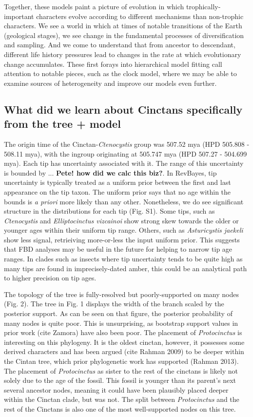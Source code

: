 \documentclass{article}
\begin{document}
Together, these models paint a picture of evolution in which trophically-important characters evolve according to different mechanisms than non-trophic characters.
We see a world in which at times of notable transitions of the Earth (geological stages), we see change in the fundamental processes of diversification and sampling.
And we come to understand that from ancestor to descendant, different life history pressures lead to changes in the rate at which evolutionary change accumulates. 
These first forays into hierarchical model fitting call attention to notable pieces, such as the clock model, where we may be able to examine sources of heterogeneity and improve our models even further.

\subsection{What did we learn about Cinctans specifically from the tree + model}

The origin time of the Cinctan-\textit{Ctenocystis} group was 507.52 mya (HPD 505.808 - 508.11 mya), with the ingroup originating at 505.747 mya (HPD 507.27 - 504.699 mya).
Each tip has uncertainty associated with it.
The range of this uncertainty is bounded by ... \textbf{Pete! how did we calc this biz?}.
In RevBayes, tip uncertainty is typically treated as a uniform prior between the first and last appearance on the tip taxon.
The uniform prior says that no age within the bounds is \textit{a priori} more likely than any other.
Nonetheless, we do see significant structure in the distributions for each tip (Fig. S1). 
Some tips, such as \textit{Ctenocystis} and \textit{Elliptocinctus vizcainoi} show strong skew towards the older or younger ages within their uniform tip range.
Others, such as \textit{Asturicystis jaekeli} show less signal, retrieiving more-or-less the input uniform prior.
This suggests that FBD analyses may be useful in the future for helping to narrow tip age ranges.
In clades such as insects where tip uncertainty tends to be quite high as many tips are found in imprecisely-dated amber, this could be an analytical path to higher precision on tip ages.

The topology of the tree is fully-resolved but poorly-supported on many nodes (Fig. 2).
The tree in Fig. 1 displays the width of the branch scaled by the posterior support.
As can be seen on that figure, the posterior probability of many nodes is quite poor. 
This is unsurprising, as bootstrap support values in prior work (cite Zamora) have also been poor.
The placement of \textit{Protocinctus} is interesting on this phylogeny. 
It is the oldest cinctan, however, it possesses some derived characters and has been argued (cite Rahman 2009) to be deeper within the Cintan tree, which prior phylogenetic work has supported (Rahman 2013). 
The placement of \textit{Protocinctus} as sister to the rest of the cinctans is likely not solely due to the age of the fossil. This fossil is younger than its parent's next several ancestor nodes, meaning it could have been plausibly placed deeper within the Cinctan clade, but was not. 
The split between \textit{Protocinctus} and the rest of the Cinctans is also one of the most well-supported nodes on this tree.
\end{document}
